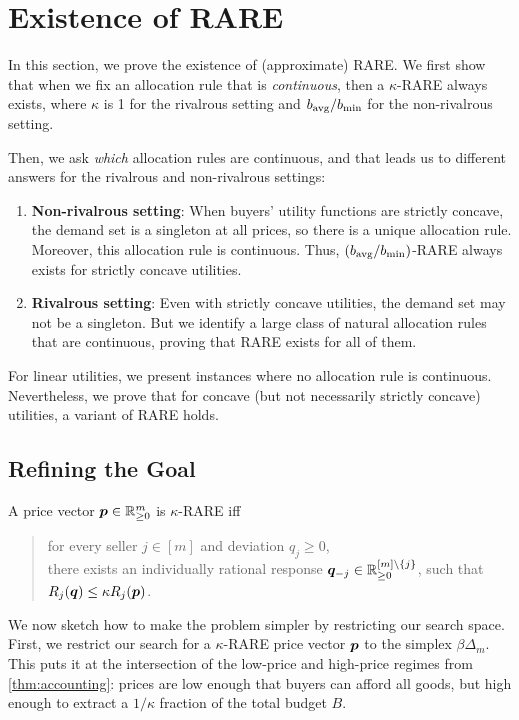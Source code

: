 \section{Existence of RARE}
\label{sec:exist}

In this section, we prove the existence of (approximate) RARE.
%
We first show that when we fix an allocation rule that is \emph{continuous},
then a $\kappa$-RARE always exists, where $\kappa$ is 1 for the rivalrous setting
and $b_{\operatorname{avg}}/b_{\min}$ for the non-rivalrous setting.

Then, we ask \emph{which} allocation rules are continuous,
and that leads us to different answers
for the rivalrous and non-rivalrous settings:
\begin{enumerate}
\item \textbf{Non-rivalrous setting}:
    When buyers' utility functions are strictly concave, the demand set is a singleton at all prices,
    so there is a unique allocation rule. Moreover, this allocation rule is continuous.
    Thus, $(b_{\operatorname{avg}}/b_{\min})$-RARE always exists for strictly concave utilities.
\item \textbf{Rivalrous setting}:
    Even with strictly concave utilities, the demand set may not be a singleton.
    But we identify a large class of natural allocation rules that are continuous,
    proving that RARE exists for all of them.
\end{enumerate}

For linear utilities, we present instances where no allocation rule is continuous.
Nevertheless, we prove that for concave (but not necessarily strictly concave) utilities,
a variant of RARE holds.

\subsection{Refining the Goal}

A price vector $\bm{p} \in \mathbb{R}_{\ge 0}^m$ is $\kappa$-RARE iff
\begin{quote}
for every seller $j \in [m]$ and deviation $q_j \ge 0$,
\\ there exists an individually rational response
$\bm{q}_{-j} \in \mathbb{R}_{\ge 0}^{[m] \setminus \{j\}}$, such that
\\ $R_j(\bm{q}) \le \kappa R_j(\bm{p})$.
\end{quote}

We now sketch how to make the problem simpler by restricting our search space.
First, we restrict our search for a $\kappa$-RARE price vector $\bm{p}$ to the simplex $\beta\Delta_m$.
This puts it at the intersection of the low-price and high-price regimes from \cref{thm:accounting}:
prices are low enough that buyers can afford all goods,
but high enough to extract a $1/\kappa$ fraction of the total budget $B$.

